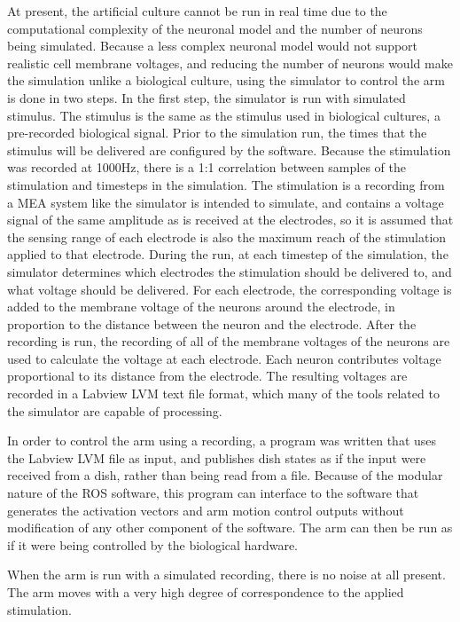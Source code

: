 \documentclass[letterpaper]{article}
\begin{document}
At present, the artificial culture cannot be run in real time due to the computational complexity of the neuronal model and the number of neurons being simulated. 
Because a less complex neuronal model would not support realistic cell membrane voltages, and reducing the number of neurons would make the simulation unlike a biological culture, using the simulator to control the arm is done in two steps. 
In the first step, the simulator is run with simulated stimulus. 
The stimulus is the same as the stimulus used in biological cultures, a pre-recorded biological signal. 
Prior to the simulation run, the times that the stimulus will be delivered are configured by the software. 
Because the stimulation was recorded at 1000Hz, there is a 1:1 correlation between samples of the stimulation and timesteps in the simulation. 
The stimulation is a recording from a MEA system like the simulator is intended to simulate, and contains a voltage signal of the same amplitude as is received at the electrodes, so it is assumed that the sensing range of each electrode is also the maximum reach of the stimulation applied to that electrode. 
During the run, at each timestep of the simulation, the simulator determines which electrodes the stimulation should be delivered to, and what voltage should be delivered.
For each electrode, the corresponding voltage is added to the membrane voltage of the neurons around the electrode, in proportion to the distance between the neuron and the electrode. 
After the recording is run, the recording of all of the membrane voltages of the neurons are used to calculate the voltage at each electrode. 
Each neuron contributes voltage proportional to its distance from the electrode. 
The resulting voltages are recorded in a Labview LVM text file format, which many of the tools related to the simulator are capable of processing. 

In order to control the arm using a recording, a program was written that uses the Labview LVM file as input, and publishes dish states as if the input were received from a dish, rather than being read from a file. 
Because of the modular nature of the ROS software, this program can interface to the software that generates the activation vectors and arm motion control outputs without modification of any other component of the software. 
The arm can then be run as if it were being controlled by the biological hardware. 

When the arm is run with a simulated recording, there is no noise at all present. 
The arm moves with a very high degree of correspondence to the applied stimulation. 
\end{document}
